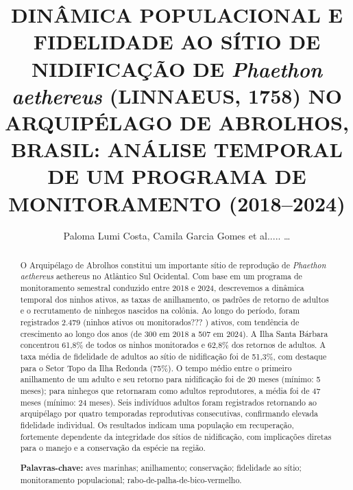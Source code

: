 \documentclass[11pt]{article}
\title{DINÂMICA POPULACIONAL E FIDELIDADE AO SÍTIO DE NIDIFICAÇÃO DE
\textit{Phaethon aethereus} (LINNAEUS, 1758) NO ARQUIPÉLAGO DE ABROLHOS,
BRASIL\@: ANÁLISE TEMPORAL DE UM PROGRAMA DE MONITORAMENTO (2018–2024)
}
\author{Paloma Lumi Costa, Camila Garcia Gomes et al..... \ldots}
\newcommand{\todourgente}[1]{%
  \todo[color=red!25]{Urgente: #1}}
\begin{document}
\maketitle

\renewcommand{\abstractname}{Resumo}
\begin{abstract}
O Arquipélago de Abrolhos constitui um importante sítio de reprodução de \textit{Phaethon aethereus} aethereus no Atlântico Sul Ocidental. Com base em um programa de monitoramento semestral conduzido entre 2018 e 2024, descrevemos a dinâmica temporal dos ninhos ativos, as taxas de anilhamento, os padrões de retorno de adultos e o recrutamento de ninhegos nascidos na colônia. Ao longo do período, foram registrados 2.479 (ninhos ativos  ou monitorados??? ) \todourgente{REVISAR OS NUMEROS}ativos, com tendência de crescimento ao longo dos anos (de 300 em 2018 a 507 em 2024). A Ilha Santa Bárbara concentrou 61,8\% de todos os ninhos monitorados e 62,8\% dos retornos de adultos. A taxa média de fidelidade de adultos ao sítio de nidificação foi de 51,3\%, com destaque para o Setor Topo da Ilha Redonda (75\%). O tempo médio entre o primeiro anilhamento de um adulto e seu retorno para nidificação foi de 20 meses (mínimo: 5 meses); para ninhegos que retornaram como adultos reprodutores, a média foi de 47 meses (mínimo: 24 meses). Seis indivíduos adultos foram registrados retornando ao arquipélago por quatro temporadas reprodutivas consecutivas, confirmando elevada fidelidade individual. Os resultados indicam uma população em recuperação, fortemente dependente da integridade dos sítios de nidificação, com implicações diretas para o manejo e a conservação da espécie na região.


\medskip
\noindent\textbf{Palavras-chave:} aves marinhas; anilhamento; conservação; fidelidade ao sítio; monitoramento populacional; rabo-de-palha-de-bico-vermelho.
\end{abstract}
\end{document}
